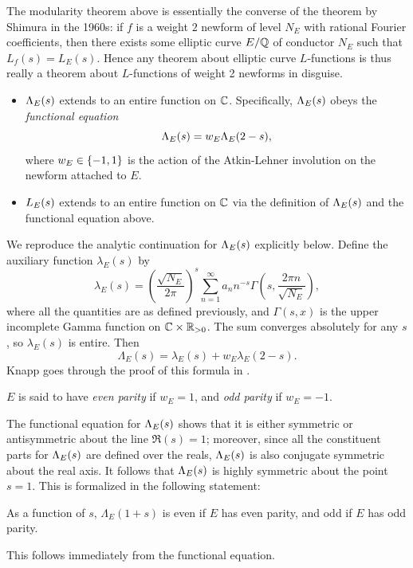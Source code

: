 The modularity theorem above is essentially the converse of the theorem by Shimura in the 1960s: if $f$ is a weight $2$ newform of level $N_E$ with rational Fourier coefficients, then there exists some elliptic curve $E/\mathbb{Q}$ of conductor $N_E$ such that $L_f(s) = L_E(s)$. Hence any theorem about elliptic curve $L$-functions is thus really a theorem about $L$-functions of weight 2 newforms in disguise. \\

\begin{corollary} \mbox{}
\begin{itemize}
\item $\Lambda_E(s)$ extends to an entire function on $\mathbb{C}$. Specifically, $\Lambda_E(s)$ obeys the {\it functional equation}
\begin{equation}
\Lambda_E(s) = w_E \Lambda_E(2-s),
\end{equation}
where $w_E \in \left\{-1, 1\right\}$ is the action of the Atkin-Lehner involution on the newform attached to $E$.
\item $L_E(s)$ extends to an entire function on $\mathbb{C}$ via the definition of $\Lambda_E(s)$ and the functional equation above.
\end{itemize}
\end{corollary}

We reproduce the analytic continuation for $\Lambda_E(s)$ explicitly below. Define the auxiliary function $\lambda_E(s)$ by
\begin{equation}\label{eqn:Lams_analytic_continuation}
\lambda_E(s) = \left(\frac{\sqrt{N_E}}{2\pi}\right)^{s} \sum_{n=1}^\infty a_n n^{-s}\Gamma \left(s,\frac{2\pi n}{\sqrt{N_E}}\right),
\end{equation}
where all the quantities are as defined previously, and $\Gamma(s,x)$ is the upper incomplete Gamma function on $\mathbb{C}\times \mathbb{R}_{>0}$. The sum converges absolutely for any $s$, so $\lambda_E(s)$ is entire. Then
\begin{equation}
\Lambda_E(s) = \lambda_E(s) + w_E \lambda_E(2-s).
\end{equation}
Knapp goes through the proof of this formula in \cite[pp. 270-271]{Kna-1992}. \\

\begin{definition}
$E$ is said to have {\it even parity} if $w_E = 1$, and {\it odd parity} if $w_E = -1$.
\end{definition}

The functional equation for $\Lambda_E(s)$ shows that it is either symmetric or antisymmetric about the line $\Re(s) = 1$; moreover, since all the constituent parts for $\Lambda_E(s)$ are defined over the reals, $\Lambda_E(s)$ is also conjugate symmetric about the real axis. It follows that $\Lambda_E(s)$ is highly symmetric about the point $s=1$. This is formalized in the following statement:
\begin{proposition}
As a function of $s$, $\Lambda_E(1+s)$ is even if $E$ has even parity, and odd if $E$ has odd parity.
\end{proposition}
This follows immediately from the functional equation. \\

